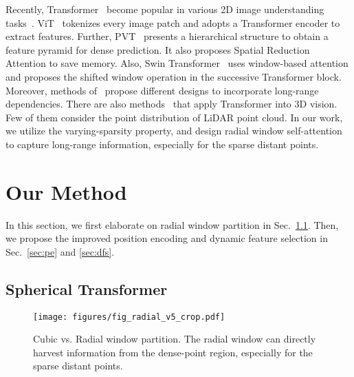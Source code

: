 \documentclass[10pt,twocolumn,letterpaper]{article}
\begin{document}
Recently, Transformer~\cite{vaswani2017attention} become popular in various 2D image understanding tasks~\cite{dosovitskiy2020vit, pmlr-v139-touvron21a, touvron2021cait, wang2021pyramid, wang2021pvtv2, liu2021Swin, chu2021Twins, yang2021focal, dong2021cswin, vip, detr, zhu2020deformable, mao2021voxel, zhao2020san}. ViT~\cite{dosovitskiy2020vit} tokenizes every image patch and adopts a Transformer encoder to extract features. Further, PVT~\cite{wang2021pyramid} presents a hierarchical structure to obtain a feature pyramid for dense prediction. It also proposes Spatial Reduction Attention to save memory. Also, Swin Transformer~\cite{liu2021Swin} uses window-based attention and proposes the shifted window operation in the successive Transformer block. Moreover, methods of~\cite{chu2021Twins, yang2021focal, dong2021cswin} propose different designs to incorporate long-range dependencies. There are also methods~\cite{zhao2021point,mao2021voxel,lai2022stratified,fan2022embracing,sun2022swformer} that apply Transformer into 3D vision. Few of them consider the point distribution of LiDAR point cloud. In our work, we utilize the varying-sparsity property, and design radial window self-attention to capture long-range information, especially for the sparse distant points.

\section{Our Method}

In this section, we first elaborate on radial window partition in Sec.~\ref{sec:radial}. Then, we propose the improved position encoding and dynamic feature selection in Sec.~\ref{sec:pe} and \ref{sec:dfs}.









\subsection{Spherical Transformer}
\label{sec:radial}

\begin{figure}
\begin{center}
\texttt{[image: figures/fig\_radial\_v5\_crop.pdf]}
\end{center}
\vspace{-0.6cm}
\caption{Cubic vs. Radial window partition. The radial window can directly harvest information from the dense-point region, especially for the sparse distant points.}
\label{fig:radial}
\vspace{-0.2cm}
\end{figure}
\end{document}
